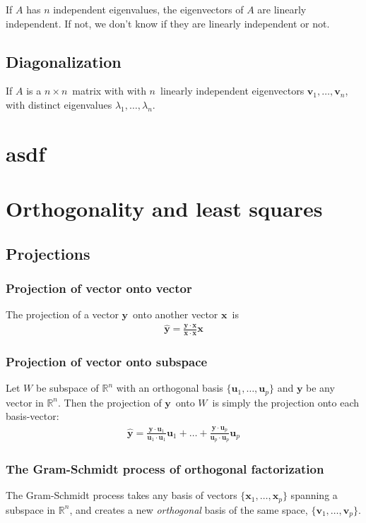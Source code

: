 \documentclass[12p,a4paper]{report}
\renewcommand{\b}{\boldsymbol}
\newcommand{\m}{\mathbb}
\begin{document}
If $A$ has $n$ independent eigenvalues, the eigenvectors of $A$ are linearly independent. If not, we don't know if they are linearly independent or not.


\section{Diagonalization}
If $A$ is a $n\times n$ matrix with with $n$ linearly independent eigenvectors $\b v_1, \dots, \b v_n$, with distinct eigenvalues $\lambda_1,\dots,\lambda_n$.


\chapter{asdf}
\chapter{Orthogonality and least squares}
\section{Projections}
\subsection{Projection of vector onto vector}
The projection of a vector $\b y$ onto another vector $\b x$ is
\begin{align*}
    \hat{\b y} = \frac{\b y \cdot \b x}{\b x \cdot \b x}\b x
\end{align*}



\subsection{Projection of vector onto subspace}
Let $W$ be subspace of $\m R^n$ with an orthogonal basis $\{\b u_1, \dots, \b u_p\}$ and $\b y$ be any vector in $\m R^n$. Then the projection of $\b y$ onto $W$ is simply the projection onto each basis-vector:
\begin{align*}
    \hat{\b y} = \frac{\b y \cdot \b u_1}{\b u_1 \cdot \b u_1}\b u_1 + \dots + \frac{\b y \cdot \b u_p}{\b u_p \cdot \b u_p}\b u_p
\end{align*}



\subsection{The Gram-Schmidt process of orthogonal factorization}
The Gram-Schmidt process takes any basis of vectors $\{\b x_1, \dots, \b x_p\}$ spanning a subspace in $\m R^n$, and creates a new \textit{orthogonal} basis of the same space, $\{\b v_1, \dots, \b v_p\}$.
\end{document}
